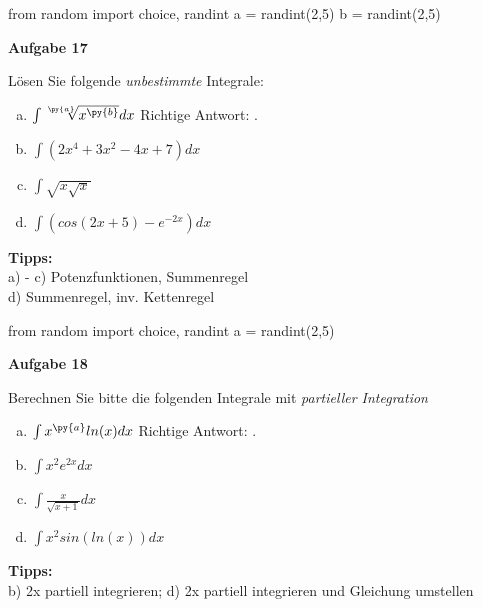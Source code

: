 \documentclass[a4paper,12pt]{article}
\newcommand{\Aufgabe}[1]{
	{
		\vspace*{0.5cm}
		\textsf{\textbf{Aufgabe #1}}
		\vspace*{0.2cm}
		
	}
}
\begin{document}
\begin{pycode}
from random import choice, randint
a = randint(2,5)
b = randint(2,5)
\end{pycode}

\Aufgabe{17}
Lösen Sie folgende \textit{unbestimmte} Integrale:
\begin{multicols}{2}
	\begin{enumerate}[a)]
		\item $\int  \sqrt[\py{a}]{x^\py{b}}dx$
		\ifnum{} 
		\newline Richtige Antwort: .
		\fi 
		\item $\int  (2x^4+3x^2-4x+7)dx$
		\item $\int  \sqrt{x \sqrt{x}}$
		\item $\int  (cos(2x+5)- e^{-2x})dx$
		
		
	\end{enumerate}
\end{multicols}
\textbf{Tipps:}\\
a) - c) Potenzfunktionen, Summenregel\\
d) Summenregel, inv. Kettenregel\\

\begin{pycode}
from random import choice, randint
a = randint(2,5)
\end{pycode}

\Aufgabe{18}
Berechnen Sie bitte die folgenden Integrale mit \textit{partieller Integration}
\begin{multicols}{2}
	\begin{enumerate}[a)]
		\item $\int  x^\py{a} ln(x)dx$
		\ifnum{} 
		\newline Richtige Antwort: .
		\fi 
		\item $\int  x^2 e^{2x}dx$
		\item $\int  \frac{x}{\sqrt{x+1}} dx$
		\item $\int  x^2 sin(ln(x))dx$
		
	\end{enumerate}
\end{multicols}
\textbf{Tipps:}\\
b) 2x partiell integrieren; d) 2x partiell integrieren und Gleichung umstellen
\end{document}
